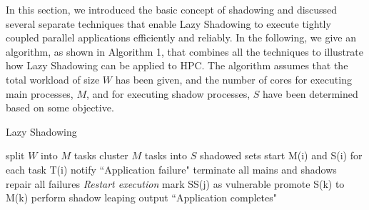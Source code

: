 

In this section, we introduced the basic concept of shadowing and discussed several separate techniques that enable Lazy Shadowing to execute tightly coupled parallel applications efficiently and reliably. In the following, we give an algorithm, as shown in Algorithm 1, that combines all the techniques to illustrate how Lazy Shadowing can be applied to HPC. The algorithm assumes that the total workload of size $W$ has been given, and the number of cores for executing main processes, $M$, and for executing shadow processes, $S$ have been determined based on some objective. %


\begin{algorithm}[t]
  \caption{Lazy Shadowing}
  \BlankLine
  split $W$ into $M$ tasks\;  
  cluster $M$ tasks into $S$ shadowed sets\;  
  start M(i) and S(i) for each task T(i)\;
    {
        {
            {
                notify ``Application failure"\;
                terminate all mains and shadows\;
                repair all failures\;
                \emph{Restart execution}\; %
            }
            {
                mark SS(j) as vulnerable\;
                {
                    promote S(k) to M(k)\;
                    perform shadow leaping\; %
                }
            }
        }  
    }
    output ``Application completes"\;
  \label{al:ls}
\end{algorithm}



